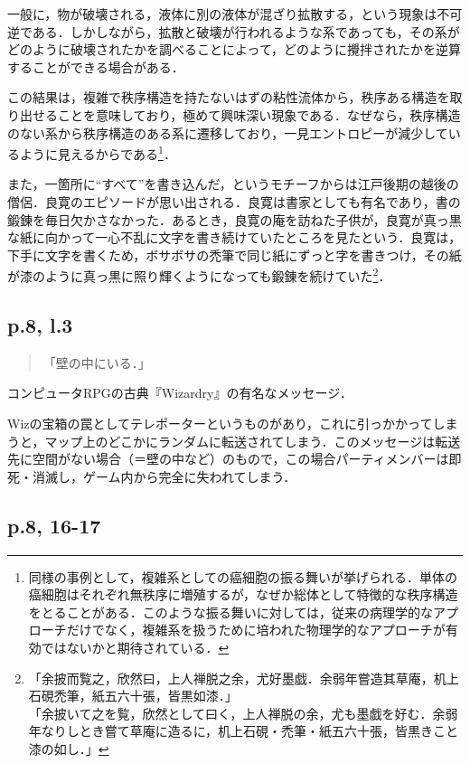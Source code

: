 \documentclass[10pt, a5paper, twoside]{jsarticle}
\theoremstyle{definition}
\begin{document}
			一般に，物が破壊される，液体に別の液体が混ざり拡散する，という現象は不可逆である．しかしながら，拡散と破壊が行われるような系であっても，その系がどのように破壊されたかを調べることによって，どのように攪拌されたかを逆算することができる場合がある\cite{nkh}．

			この結果は，複雑で秩序構造を持たないはずの粘性流体から，秩序ある構造を取り出せることを意味しており，極めて興味深い現象である．なぜなら，秩序構造のない系から秩序構造のある系に遷移しており，一見エントロピーが減少しているように見えるからである\footnote{同様の事例として，複雑系としての癌細胞の振る舞いが挙げられる．単体の癌細胞はそれぞれ無秩序に増殖するが，なぜか総体として特徴的な秩序構造をとることがある．このような振る舞いに対しては，従来の病理学的なアプローチだけでなく，複雑系を扱うために培われた物理学的なアプローチが有効ではないかと期待されている．}．

			また，一箇所に“すべて”を書き込んだ，というモチーフからは江戸後期の越後の僧侶．良寛のエピソードが思い出される．良寛は書家としても有名であり，書の鍛錬を毎日欠かさなかった．あるとき，良寛の庵を訪ねた子供が，良寛が真っ黒な紙に向かって一心不乱に文字を書き続けていたところを見たという．良寛は，下手に文字を書くため，ボサボサの禿筆で同じ紙にずっと字を書きつけ，その紙が漆のように真っ黒に照り輝くようになっても鍛錬を続けていた\footnote{「余披而覧之，欣然曰，上人禅脱之余，尤好墨戯．余弱年嘗造其草庵，机上石硯禿筆，紙五六十張，皆黒如漆．」\\「余披いて之を覧，欣然として曰く，上人禅脱の余，尤も墨戯を好む．余弱年なりしとき嘗て草庵に造るに，机上石硯・禿筆・紙五六十張，皆黒きこと漆の如し．」\cite{ryo}}．

		\subsection{p.8, l.3}

			\begin{quote}

				「壁の中にいる．」
				
			\end{quote}

			コンピュータRPGの古典『Wizardry』の有名なメッセージ．

			Wizの宝箱の罠としてテレポーターというものがあり，これに引っかかってしまうと，マップ上のどこかにランダムに転送されてしまう．このメッセージは転送先に空間がない場合（＝壁の中など）のもので，この場合パーティメンバーは即死・消滅し，ゲーム内から完全に失われてしまう．

		\subsection{p.8, 16-17}
\end{document}
